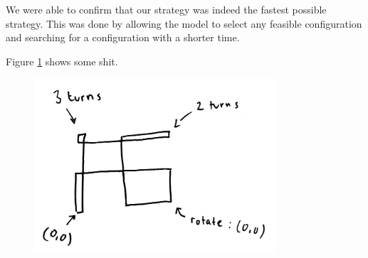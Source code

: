 \documentclass{article}
\begin{document}
We were able to confirm that our strategy was indeed the fastest possible strategy. This was done by allowing the model to select any feasible configuration and searching for a configuration with a shorter time.

Figure \ref{fig:strategy} shows some shit.

\begin{figure}[h!]
	\centering
	\includegraphics[width=0.8\textwidth]{strategy.png}
	\label{fig:strategy}
\end{figure}

\end{document}
